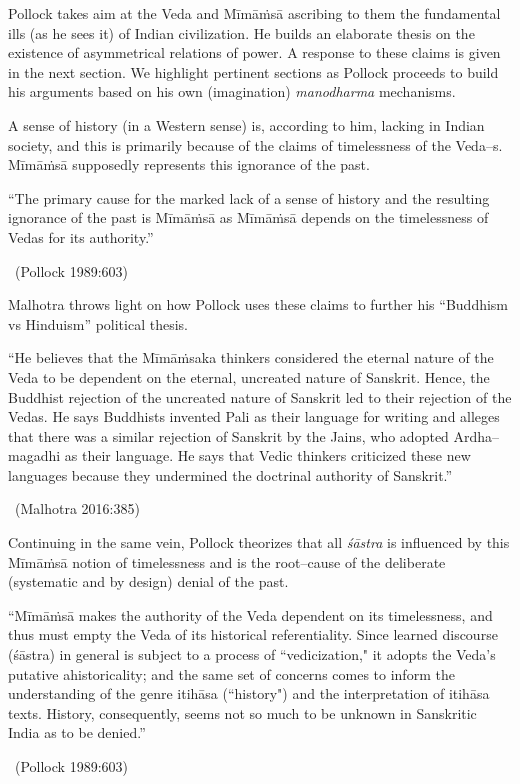 Pollock takes aim at the Veda and Mīmāṁsā ascribing to them the fundamental ills (as he sees it) of Indian civilization. He builds an elaborate thesis on the existence of asymmetrical relations of power. A response to these claims is given in the next section. We highlight pertinent sections as Pollock proceeds to build his arguments based on his own (imagination) \textit{manodharma} mechanisms.

A sense of history (in a Western sense) is, according to him, lacking in Indian society, and this is primarily because of the claims of timelessness of the Veda–s. Mīmāṁsā supposedly represents this ignorance of the past.

\begin{myquote}
“The primary cause for the marked lack of a sense of history and the resulting ignorance of the past is Mīmāṁsā as Mīmāṁsā depends on the timelessness of Vedas for its authority.” 

~\hfill (Pollock 1989:603)
\end{myquote}

Malhotra throws light on how Pollock uses these claims to further his “Buddhism vs Hinduism” political thesis.

\begin{myquote}
“He believes that the Mīmāṁsaka thinkers considered the eternal nature of the Veda to be dependent on the eternal, uncreated nature of Sanskrit. Hence, the Buddhist rejection of the uncreated nature of Sanskrit led to their rejection of the Vedas. He says Buddhists invented Pali as their language for writing and alleges that there was a similar rejection of Sanskrit by the Jains, who adopted Ardha–magadhi as their language. He says that Vedic thinkers criticized these new languages because they undermined the doctrinal authority of Sanskrit.” 

~\hfill (Malhotra 2016:385)
\end{myquote}

Continuing in the same vein, Pollock theorizes that all \textit{śāstra} is influenced by this Mīmāṁsā notion of timelessness and is the root–cause of the deliberate (systematic and by design) denial of the past.

\begin{myquote}
“Mīmāṁsā makes the authority of the Veda dependent on its timelessness, and thus must empty the Veda of its historical referentiality. Since learned discourse (śāstra) in general is subject to a process of “vedicization," it adopts the Veda's putative ahistoricality; and the same set of concerns comes to inform the understanding of the genre itihāsa (“history") and the interpretation of itihāsa texts. History, consequently, seems not so much to be unknown in Sanskritic India as to be denied.” 

~\hfill (Pollock 1989:603)
\end{myquote}

